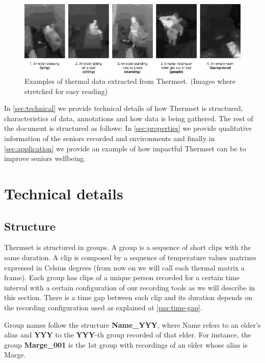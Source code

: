 \documentclass[oneside, twocolumn]{article}
\begin{document}
\begin{figure}
  \centering
    \includegraphics[width=1.0\textwidth]{images/examples}
  \caption{Examples of thermal data extracted from Thermset. (Images where stretched for easy reading)}
  \label{fig:examples}
\end{figure}



In \autoref{sec:technical} we provide technical details of how Thermset is structured, characteristics of data,
annotations and how data is being gathered. The rest of the document is structured as follows:
In \autoref{sec:properties} we provide qualitative information of the seniors recorded and environments and
finally in \autoref{sec:application} we provide an example of how impactful Thermset can be to improve seniors
wellbeing.


\section{Technical details}
\label{sec:technical}
\subsection{Structure}
Thermset is structured in groups. A group is a sequence of short clips with the same duration.
A clip is composed by a sequence of temperature values matrixes expressed in Celsius degrees
(from now on we will call each thermal matrix a frame). Each group has clips of a unique person
recorded for a certain time interval with a certain configuration of our recording tools as we will
describe in this section. There is a time gap between each clip and its duration depends on the recording
configuration used as explained at \autoref{par:time-gap}.

Group names follow the structure \textbf{Name\_YYY}, where Name refers to an elder's alias and \textbf{YYY}
to the \textbf{YYY}-th group recorded of that elder. For instance, the group \textbf{Marge\_001} is the
1st group with recordings of an elder whose alias is Marge.
\end{document}
